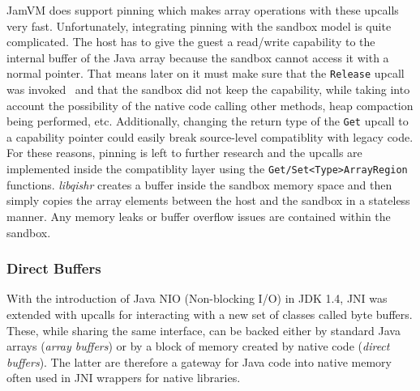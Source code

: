 \documentclass[a4paper,12pt,twoside,openright]{report}
\newcommand{\tool}[1]{\emph{#1}}
\newcommand{\lib}[1]{\tool{lib#1}}
\begin{document}
JamVM does support pinning which makes array operations with these upcalls very fast. Unfortunately, integrating pinning with the sandbox model is quite complicated. The host has to give the guest a read/write capability to the internal buffer of the Java array because the sandbox cannot access it with a normal pointer. That means later on it must make sure that the \texttt{Release} upcall was invoked~\cite{Kondoh:2008:FBJ:1390630.1390645} and that the sandbox did not keep the capability, while taking into account the possibility of the native code calling other methods, heap compaction being performed, etc. Additionally, changing the return type of the \texttt{Get} upcall to a capability pointer could easily break source-level compatiblity with legacy code. For these reasons, pinning is left to further research and the upcalls are implemented inside the compatiblity layer using the \texttt{Get/Set\-<Type>\-Array\-Region} functions. \lib{qishr} creates a buffer inside the sandbox memory space and then simply copies the array elements between the host and the sandbox in a stateless manner. Any memory leaks or buffer overflow issues are contained within the sandbox.

\label{ArraysCriticalSection}

\subsubsection{Direct Buffers}
\label{sec:DirectBuffers}

With the introduction of Java NIO (Non-blocking I/O) in JDK 1.4, JNI was extended with upcalls for interacting with a new set of classes called byte buffers. These, while sharing the same interface, can be backed either by standard Java arrays (\emph{array buffers}) or by a block of memory created by native code (\emph{direct buffers}). The latter are therefore a gateway for Java code into native memory often used in JNI wrappers for native libraries.
\end{document}
